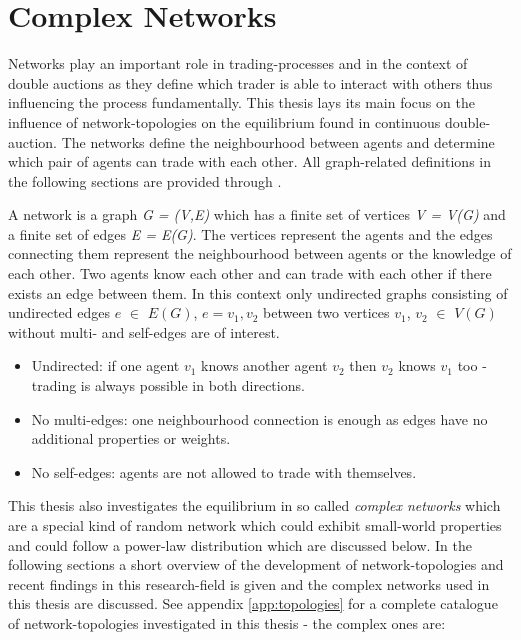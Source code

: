 \documentclass[../Bachelorarbeit.tex]{subfiles}
\begin{document}
\graphicspath{{./figures/theory/nw/}}	%

\section{Complex Networks}
\label{sec:theory_complexNetworks}
Networks play an important role in trading-processes and in the context of double auctions as they define which trader is able to interact with others thus influencing the process fundamentally. This thesis lays its main focus on the influence of network-topologies on the equilibrium found in continuous double-auction. The networks define the neighbourhood between agents and determine which pair of agents can trade with each other. All graph-related definitions in the following sections are provided through \cite{Drmota2007}.

\medskip

A network is a graph \textit{G = (V,E)} which has a finite set of vertices \textit{V = V(G)} and a finite set of edges \textit{E = E(G)}. The vertices represent the agents and the edges connecting them represent the neighbourhood between agents or the knowledge of each other. Two agents know each other and can trade with each other if there exists an edge between them. In this context only undirected graphs consisting of undirected edges $e$ $\in$ $E(G)$, $e = {v_1, v_2}$ between two vertices $v_1$, $v_2$ $\in$ $V(G)$ without multi- and self-edges are of interest.

\begin{itemize}
\item Undirected: if one agent $v_1$ knows another agent $v_2$ then $v_2$ knows $v_1$ too - trading is always possible in both directions.
\item No multi-edges: one neighbourhood connection is enough as edges have no additional properties or weights.
\item No self-edges: agents are not allowed to trade with themselves.
\end{itemize}

This thesis also investigates the equilibrium in so called \textit{complex networks} which are a special kind of random network which could exhibit small-world properties and could follow a power-law distribution which are discussed below. In the following sections a short overview of the development of network-topologies and recent findings in this research-field is given and the complex networks used in this thesis are discussed. See appendix \ref{app:topologies} for a complete catalogue of network-topologies investigated in this thesis - the complex ones are:
\end{document}
